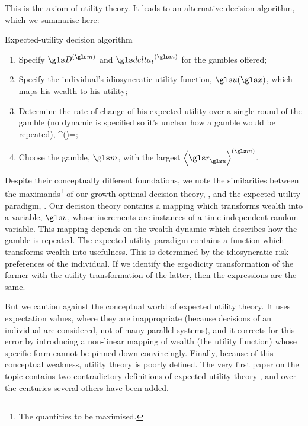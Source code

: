 This is the axiom of utility theory. It leads to an alternative decision algorithm, which we summarise here:
\begin{keypts}{Expected-utility decision algorithm}
\begin{enumerate}
\item Specify $\gD^{(\m)}$ and $\dt^{(\m)}$ for the gambles offered;
\item Specify the individual's idiosyncratic utility function, $\gu(\x)$, which maps his wealth to his utility;
\item Determine the rate of change of his expected utility over a single round of the gamble (no dynamic is specified so it's unclear how a gamble would be repeated),
\be
\ave{\gr_\gu}^{(\m)}=\ave{\frac{\gu\left(\x+\gD^{(\m)}\right)-\gu(\x)}{\dt^{(\m)}}};
\ee
\item Choose the gamble, $\m$, with the largest $\ave{\gr_\gu}^{(\m)}$.
\end{enumerate}
\end{keypts}

Despite their conceptually different foundations, we note the similarities between the 
maximands\footnote{The quantities to be maximised.} of our growth-optimal decision 
theory, , and the expected-utility paradigm, . Our decision theory
contains a mapping which transforms wealth into a variable, $\gv$, whose increments are 
instances of a time-independent random variable. This mapping depends on the wealth dynamic which 
describes how the gamble is repeated. The expected-utility paradigm contains a function which transforms 
wealth into usefulness. This is determined by the idiosyncratic risk preferences of 
the individual. If we identify the ergodicity transformation of the former with the 
utility transformation of the latter, then the expressions are the same.

But we caution against the conceptual world of expected utility theory. It uses expectation
values, where they are inappropriate (because decisions of an individual are considered, 
not of many parallel systems), and it corrects for this error by introducing a non-linear 
mapping of wealth (the utility function) whose specific form cannot be pinned down 
convincingly. Finally, because of this conceptual weakness, utility theory is poorly defined. 
The very first paper on the topic contains two contradictory definitions of expected utility 
theory \cite{Bernoulli1738}, and over the centuries several others have been added.

